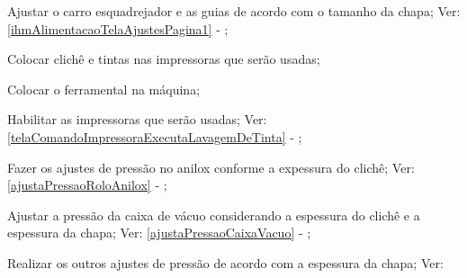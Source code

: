 \begin{procedureAdjustmentNoRecipe}
  \item[\ding{\dingNumber}] Ajustar o carro esquadrejador e as guias de acordo com o tamanho da chapa; Ver: \ref{ihmAlimentacaoTelaAjustesPagina1} - ;
  \item[\ding{\dingNumber}] Colocar clichê e tintas nas impressoras que serão usadas;
  \item[\ding{\dingNumber}] Colocar o ferramental na máquina;
  \item[\ding{\dingNumber}] Habilitar as impressoras que serão usadas; Ver: \ref{telaComandoImpressoraExecutaLavagemDeTinta} - ;
  \item[\ding{\dingNumber}] Fazer os ajustes de pressão no anilox conforme a expessura do clichê; Ver: \ref{ajustaPressaoRoloAnilox} - ;
  \item[\ding{\dingNumber}] Ajustar a pressão da caixa de vácuo considerando a espessura do clichê e a espessura da chapa; Ver: \ref{ajustaPressaoCaixaVacuo} - ;
  \item[\ding{\dingNumber}] Realizar os outros ajustes de pressão de acordo com a espessura da chapa; Ver: 


\end{procedureAdjustmentNoRecipe}
